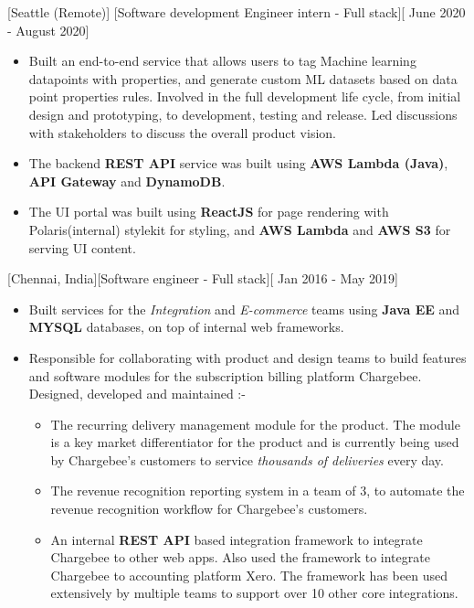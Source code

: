 \documentclass{article}
\begin{document}
[\normalfont{}Seattle (Remote)]
[Software development Engineer intern - Full stack][\normalfont{} June 2020 - August 2020]
\vspace{0.25cm}
\begin{itemize}
\item Built an end-to-end service that allows users to tag Machine learning datapoints with properties, and generate custom ML datasets based 
on data point properties rules. Involved in the full development life cycle, from initial design and prototyping, to development, testing and release. 
Led discussions with stakeholders to discuss the overall product vision.
\item The backend \textbf{REST API} service was built using \textbf{AWS Lambda (Java)}, \textbf{API Gateway} and \textbf{DynamoDB}.
\item The UI portal was built using \textbf{ReactJS} for page rendering with Polaris(internal) stylekit for styling, and \textbf{AWS Lambda} 
and \textbf{AWS S3} for serving UI content.


\end{itemize}

[\normalfont{}Chennai, India][Software engineer - Full stack][\normalfont{} Jan 2016 - May 2019]
\vspace{0.25cm}
\begin{itemize}
\item Built services for the  \emph{Integration} and \emph{E-commerce} teams using \textbf{Java EE} and \textbf{MYSQL} databases, 
on top of internal web frameworks.
\item Responsible for collaborating with product and design teams to build features 
and software modules for the subscription billing platform Chargebee. Designed, developed and maintained :-
\begin{itemize}
\item The recurring delivery management module for the product. The module is a key market differentiator for the product and is currently being used by Chargebee’s customers to 
service \emph{thousands of deliveries} every day.
\item The revenue recognition reporting system in a team of 3, to automate the revenue recognition workflow for 
Chargebee’s customers.
\item An internal \textbf{REST API} based integration framework to integrate Chargebee to other web apps. Also used the framework to integrate 
Chargebee to accounting platform Xero. The framework has been used extensively by multiple teams to support over 10 other core integrations.
\end{itemize}
\end{itemize}
\end{document}
